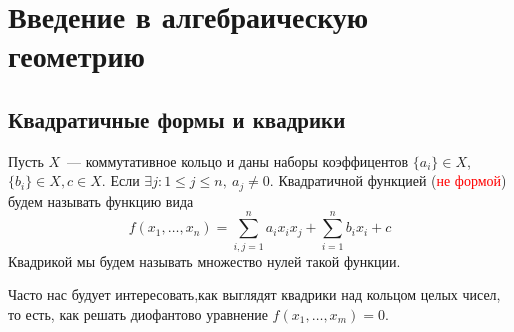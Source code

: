 \documentclass[11pt]{article}
\begin{document}
    \section{Введение в алгебраическую геометрию}
    \subsection{Квадратичные формы и квадрики}
    \begin{definition}
        Пусть $X$~--- коммутативное кольцо и даны наборы коэффицентов $\{ a_i \} \in X$, $\{ b_i \} \in X, c \in X$.
        Если $\exists j\colon 1 \le j \le n, \ a_j \neq 0$.
        Квадратичной функцией (\textcolor{red}{не формой})  будем называть функцию вида
        \[ f(x_1, \ldots, x_n) = \sum\limits_{i, j = 1}^{n} a_{i} x_i x_j + \sum\limits_{i = 1}^{n} b_i x_i + c  \]
        Квадрикой мы будем называть множество нулей такой функции.
    \end{definition}
    Часто нас будует интересовать,как выглядят квадрики над кольцом целых чисел, то есть, как решать диофантово уравнение
    $f(x_1, \ldots, x_m) = 0$.  
\end{document}
